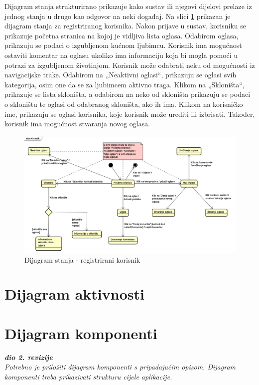 			Dijagram stanja strukturirano prikazuje kako sustav ili njegovi dijelovi prelaze iz jednog stanja u drugo kao odgovor na neki događaj. Na slici \ref{fig:dijagramstanja} prikazan je dijagram stanja za registriranog korisnika. Nakon prijave u sustav, korisniku se prikazuje početna stranica na kojoj je vidljiva lista oglasa. Odabirom oglasa, prikazuju se podaci o izgubljenom kućnom ljubimcu. Korisnik ima mogućnost ostaviti komentar na oglasu ukoliko ima informaciju koja bi mogla pomoći u potrazi za izgubljenom životinjom. Korisnik može odabrati neku od mogućnosti iz navigacijske trake. Odabirom na „Neaktivni oglasi“, prikazuju se oglasi svih kategorija, osim one da se za ljubimcem aktivno traga. Klikom na „Skloništa“, prikazuje se lista skloništa, a odabirom na neko od skloništa prikazuju se podaci o skloništu te oglasi od odabranog skloništa, ako ih ima. Klikom na korisničko ime, prikazuju se oglasi korisnika, koje korisnik može urediti ili izbrisati. Također, korisnik ima mogućnost stvaranja novog oglasa.
			
			\begin{figure}[H]
				\includegraphics[width=\textwidth]{dijagram_stanja.JPEG}
				\centering
				\caption{Dijagram stanja - registrirani korisnik}
				\label{fig:dijagramstanja}
			\end{figure}
			
			
			\eject 
		
		\section{Dijagram aktivnosti}
			
			
			
			\eject
		\section{Dijagram komponenti}
		
			\textbf{\textit{dio 2. revizije}}\\
		
			 \textit{Potrebno je priložiti dijagram komponenti s pripadajućim opisom. Dijagram komponenti treba prikazivati strukturu cijele aplikacije.}